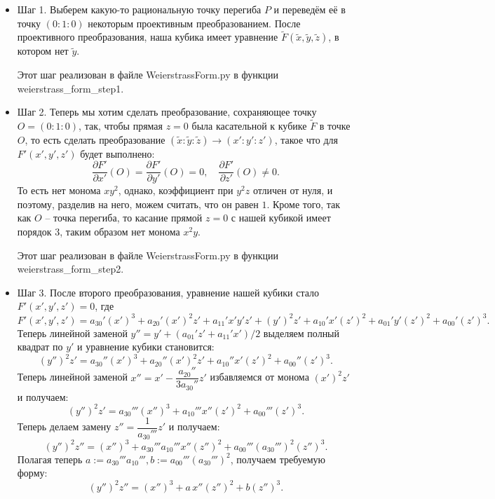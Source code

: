 \begin{itemize}[leftmargin=0.6cm]
    \item Шаг 1. Выберем какую-то рациональную точку перегиба \(P\) и
    переведём её в точку \((0 : 1 : 0)\) некоторым проективным
    преобразованием. После проективного преобразования, наша кубика имеет
    уравнение \(\widetilde{F}(\widetilde{x}, \widetilde{y}, \widetilde{z})\),
    в котором нет \(\widetilde{y}\). 

    Этот шаг реализован в файле \textsf{WeierstrassForm.py} в функции
    \textsf{weierstrass\_form\_step1}.


    \item Шаг 2. Теперь мы хотим сделать преобразование,
    сохраняющее точку \(O = (0 : 1 : 0)\), так, чтобы
    прямая \(z = 0\) была касательной к кубике \(\widetilde{F}\) в точке
    \(O\), то есть сделать преобразование \((\widetilde{x} :
    \widetilde{y} : \widetilde{z}) \to (x' : y' : z')\), такое что
    для \(F'(x', y', z')\) будет выполнено: 
     \[
    \frac{\partial F'}{\partial x'} (O) = \frac{\partial F'}{\partial y'}
    (O) = 0, \quad \frac{\partial F'}{\partial z'} (O) \ne 0
    .\]
    То есть нет монома \(x y^2\), однако, коэффициент при \(y^2 z\) отличен от
    нуля, и поэтому, разделив на него, можем считать, что он равен \(1\).
    Кроме того, так как \(O\) -- точка перегиба, то касание прямой \(z = 0\) с
    нашей кубикой имеет порядок 3, таким образом нет монома \(x^2 y\). 
    
    Этот шаг реализован в файле \textsf{WeierstrassForm.py} в функции
    \textsf{weierstrass\_form\_step2}.

    \item Шаг 3. После второго преобразования, уравнение нашей кубики стало \(F'(x',
    y', z') = 0\), где 
    \[
    F'(x', y', z') = a_{30}' \left( x' \right)^3 + a_{20}' \left( x' \right)^2
    z' + a_{11}' x' y' z' + \left( y' \right)^2 z' + a_{10}' x' \left(
    z' \right)^2 + a_{01}' y' \left( z' \right)^2 + a_{00}' \left( z'
    \right)^3
    .\] 
    Теперь линейной заменой \(y'' =  y' + (a_{01}' z' + a_{11}' x')/2\) выделяем полный
    квадрат по \(y'\) и уравнение кубики становится:
    \[
    \left( y'' \right)^2 z' = a_{30}'' \left( x' \right)^3 + a_{20}'' \left( x' \right)^2
    z' + a_{10}'' x' \left( z' \right)^2 + a_{00}'' \left( z' \right)^3
    .\] 
    Теперь линейной заменой \(x'' = x' - \dfrac{a_{20}''}{3 a_{30}''} z'\)
    избавляемся от монома \(\left( x' \right)^2 z'\) и получаем:
    \[
    \left( y'' \right)^2 z' = a_{30}''' \left( x'' \right)^3 + a_{10}''' x''
    \left( z' \right)^2 + a_{00}''' \left( z' \right)^3
    .\] 
    Теперь делаем замену \(z'' = \dfrac{1}{a_{30}'''} z'\) и получаем:
    \[
    \left( y'' \right)^2 z'' = \left( x'' \right)^3 + a_{30}''' a_{10}''' x''
    \left( z'' \right)^2 + a_{00}''' \left( a_{30}''' \right)^2 \left( z'' \right)^3
    .\] 
    Полагая теперь \(a := a_{30}''' a_{10}''', b := a_{00}''' \left( a_{30}'''
    \right)^2\), получаем требуемую форму: 
    \[
    \left( y'' \right)^2 z'' = \left( x'' \right)^3 + a \, x''
    \left( z'' \right)^2 + b \left( z'' \right)^3
    .\] 


\end{itemize}
